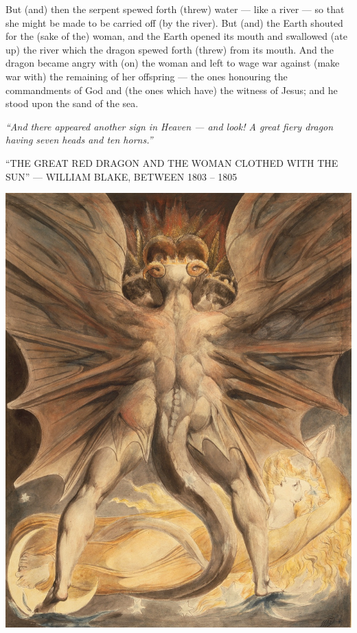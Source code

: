 \begin{pages}
\begin{Leftside}
		\pend
		\pstart
		But (and) then the serpent spewed forth (threw) water — like a river — so that she might be made to be carried off (by the river). But (and) the Earth shouted for the (sake of the) woman, and the Earth opened its mouth and swallowed (ate up) the river which the dragon spewed forth (threw) from its mouth. 
		\pend
		\pstart
		And the dragon became angry with (on) the woman and left to wage war against (make war with) the remaining of her offspring — the ones honouring the commandments of God and (the ones which have) the witness of Jesus; and he stood upon the sand of the sea. 
		\pend
        \endnumbering
    \end{Leftside}

\end{pages} 
\Pages

\clearpage
\thispagestyle{empty}
\null\vfill
\settowidth{}
\begin{center}
\parbox{\longest}{%
  \raggedright{\huge\itshape%
    ``And there appeared another sign in Heaven — and look! A great fiery dragon having seven heads and ten horns.'' \par\bigskip
  }
  \raggedleft\Large\MakeUppercase{``The Great Red Dragon and the Woman Clothed with the Sun'' — William Blake, between 1803 – 1805}\par%
}
\vfill\vfill
\clearpage\newpage
\end{center}
\newpage
\thispagestyle{empty}
\begin{center}
	\includegraphics[width=1\textwidth]{images/illustrations/blakedragonwoman}
\end{center}